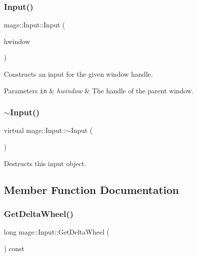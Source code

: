 \subsubsection{\texorpdfstring{Input()}{Input()}}
{\footnotesize\ttfamily mage\+::\+Input\+::\+Input (\begin{DoxyParamCaption}\item[{H\+W\+ND}]{hwindow }\end{DoxyParamCaption})}

Constructs an input for the given window handle.


\begin{DoxyParams}[1]{Parameters}
\mbox{\tt in}  & {\em hwindow} & The handle of the parent window. \\
\hline
\end{DoxyParams}
\hypertarget{classmage_1_1_input_a52324bfe97e7245176f77ac9e635df53}{}\label{classmage_1_1_input_a52324bfe97e7245176f77ac9e635df53} 
\subsubsection{\texorpdfstring{$\sim$\+Input()}{~Input()}}
{\footnotesize\ttfamily virtual mage\+::\+Input\+::$\sim$\+Input (\begin{DoxyParamCaption}{ }\end{DoxyParamCaption})\hspace{0.3cm}{\ttfamily [virtual]}}

Destructs this input object. 

\subsection{Member Function Documentation}
\hypertarget{classmage_1_1_input_a59c042bc18b47bca3010eb4df7de44c2}{}\label{classmage_1_1_input_a59c042bc18b47bca3010eb4df7de44c2} 
\subsubsection{\texorpdfstring{Get\+Delta\+Wheel()}{GetDeltaWheel()}}
{\footnotesize\ttfamily long mage\+::\+Input\+::\+Get\+Delta\+Wheel (\begin{DoxyParamCaption}{ }\end{DoxyParamCaption}) const}

